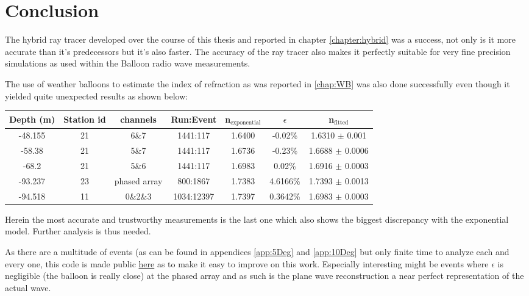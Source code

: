 \chapter*{Conclusion}
The hybrid ray tracer developed over the course of this thesis and reported in
chapter \ref{chapter:hybrid} was a success, not only is it more accurate than
it's predecessors but it's also faster.  The accuracy of the ray tracer also
makes it perfectly suitable for very fine precision simulations as used within
the Balloon radio wave measurements.

The use of weather balloons to estimate the index of refraction as
was reported in \ref{chap:WB} was also done successfully even though
it yielded quite unexpected results as shown below:
\begin{center}
\begin{tabular}{||c c c c c c c||}
 \hline
 Depth (m) & Station id & channels & Run:Event & n$_\text{exponential}$ & $\epsilon$ & n$_\text{fitted}$\\ [0.5ex]
 \hline\hline
-48.155 & 21 & 6\&7 & 1441:117 & 1.6400 & -0.02\% & 1.6310 $\pm$ 0.001 \\
 -58.38 & 21 & 5\&7 & 1441:117 & 1.6736 & -0.23\% & 1.6688 $\pm$ 0.0006 \\
 -68.2 & 21 & 5\&6 & 1441:117 & 1.6983 & 0.02\% & 1.6916 $\pm$ 0.0003 \\
 -93.237 & 23 & phased array & 800:1867 & 1.7383 & 4.6166\% & 1.7393 $\pm$ 0.0013 \\
 -94.518 & 11 & 0\&2\&3 & 1034:12397 & 1.7397 & 0.3642\% & 1.6983 $\pm$ 0.0003 \\
 \hline
\end{tabular}
\end{center}
Herein the most accurate and trustworthy measurements is the last one which
also shows the biggest discrepancy with the exponential model. Further
analysis is thus needed.

As there are a multitude of events (as can be found in appendices
\ref{app:5Deg} and \ref{app:10Deg} but only finite time to analyze each and
every one, this code is made public
\href{https://github.com/arthuradriaens-code/projects-mt.git}{here} as to make
it easy to improve on this work.  Especially interesting might be events where
$\epsilon$ is negligible (the balloon is really close) at the phased array and
as such is the plane wave reconstruction a near perfect representation of the
actual wave.

